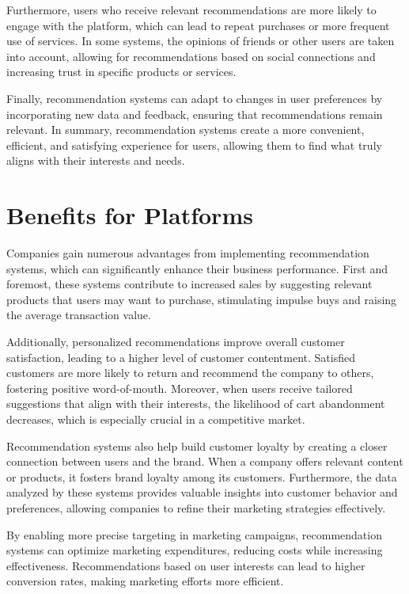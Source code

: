 \documentclass[10pt,twoside,slovak,a4paper]{article}
\begin{document}
Furthermore, users who receive relevant recommendations are more likely to engage with the platform, which can lead to repeat purchases or more frequent use of services. In some systems, the opinions of friends or other users are taken into account, allowing for recommendations based on social connections and increasing trust in specific products or services.

Finally, recommendation systems can adapt to changes in user preferences by incorporating new data and feedback, ensuring that recommendations remain relevant. In summary, recommendation systems create a more convenient, efficient, and satisfying experience for users, allowing them to find what truly aligns with their interests and needs.



\newpage
\section{Benefits for Platforms} \label{Benefits for Platforms}
Companies gain numerous advantages from implementing recommendation systems, which can significantly enhance their business performance. First and foremost, these systems contribute to increased sales by suggesting relevant products that users may want to purchase, stimulating impulse buys and raising the average transaction value.

Additionally, personalized recommendations improve overall customer satisfaction, leading to a higher level of customer contentment. Satisfied customers are more likely to return and recommend the company to others, fostering positive word-of-mouth. Moreover, when users receive tailored suggestions that align with their interests, the likelihood of cart abandonment decreases, which is especially crucial in a competitive market.

Recommendation systems also help build customer loyalty by creating a closer connection between users and the brand. When a company offers relevant content or products, it fosters brand loyalty among its customers. Furthermore, the data analyzed by these systems provides valuable insights into customer behavior and preferences, allowing companies to refine their marketing strategies effectively.

By enabling more precise targeting in marketing campaigns, recommendation systems can optimize marketing expenditures, reducing costs while increasing effectiveness. Recommendations based on user interests can lead to higher conversion rates, making marketing efforts more efficient.
\end{document}
